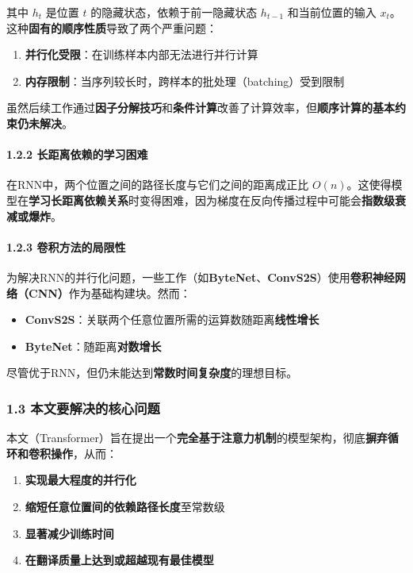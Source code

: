 \documentclass[11pt,a4paper]{article}
\begin{document}
其中 $h_t$ 是位置 $t$ 的隐藏状态，依赖于前一隐藏状态 $h_{t-1}$ 和当前位置的输入 $x_t$。这种\textbf{固有的顺序性质}导致了两个严重问题：

\begin{enumerate}
  \item \textbf{并行化受限}：在训练样本内部无法进行并行计算
  \item \textbf{内存限制}：当序列较长时，跨样本的批处理（batching）受到限制
\end{enumerate}

虽然后续工作通过\textbf{因子分解技巧}和\textbf{条件计算}改善了计算效率，但\textbf{顺序计算的基本约束仍未解决}。

\paragraph{1.2.2 长距离依赖的学习困难}

在RNN中，两个位置之间的路径长度与它们之间的距离成正比 $O(n)$。这使得模型在\textbf{学习长距离依赖关系}时变得困难，因为梯度在反向传播过程中可能会\textbf{指数级衰减或爆炸}。

\paragraph{1.2.3 卷积方法的局限性}

为解决RNN的并行化问题，一些工作（如\textbf{ByteNet}、\textbf{ConvS2S}）使用\textbf{卷积神经网络（CNN）}作为基础构建块。然而：

\begin{itemize}
  \item \textbf{ConvS2S}：关联两个任意位置所需的运算数随距离\textbf{线性增长}
  \item \textbf{ByteNet}：随距离\textbf{对数增长}
\end{itemize}

尽管优于RNN，但仍未能达到\textbf{常数时间复杂度}的理想目标。

\subsubsection*{1.3 本文要解决的核心问题}

本文（Transformer）旨在提出一个\textbf{完全基于注意力机制}的模型架构，彻底\textbf{摒弃循环和卷积操作}，从而：

\begin{enumerate}
  \item \textbf{实现最大程度的并行化}
  \item \textbf{缩短任意位置间的依赖路径长度}至常数级
  \item \textbf{显著减少训练时间}
  \item \textbf{在翻译质量上达到或超越现有最佳模型}
\end{enumerate}
\end{document}
